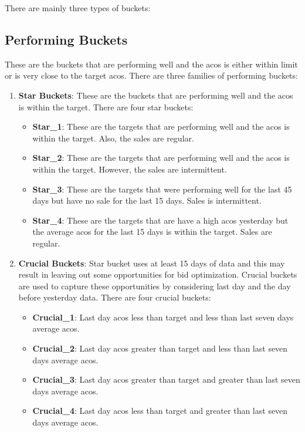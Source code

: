 There are mainly three types of buckets:

\subsection{Performing Buckets}

These are the buckets that are performing well and the acos is either within limit or is very close to the target acos. There are three families of performing buckets:

\begin{enumerate}
    \item \textbf{Star Buckets}: These are the buckets that are performing well and the acos is within the target. There are four star buckets:
          \begin{itemize}
              \item \textbf{Star\_1}: These are the targets that are performing well and the acos is within the target. Also, the sales are regular.
              \item \textbf{Star\_2}: These are the targets that are performing well and the acos is within the target. However, the sales are intermittent.
              \item \textbf{Star\_3}: These are the targets that were performing well for the last 45 days but have no sale for the last 15 days. Sales is intermittent.
              \item \textbf{Star\_4}: These are the targets that are have a high acos yesterday but the average acos for the last 15 days is within the target. Sales are regular.
          \end{itemize}
    \item \textbf{Crucial Buckets}: Star bucket uses at least 15 days of data and this may result in leaving out some opportunities for bid optimization. Crucial buckets are used to capture these opportunities by considering last day and the day before yesterday data. There are four crucial buckets:
          \begin{itemize}
              \item \textbf{Crucial\_1}: Last day acos less than target and less than last seven days average acos.
              \item \textbf{Crucial\_2}: Last day acos greater than target and less than last seven days average acos.
              \item \textbf{Crucial\_3}: Last day acos greater than target and greater than last seven days average acos.
              \item \textbf{Crucial\_4}: Last day acos less than target and greater than last seven days average acos.

\end{itemize}
\end{enumerate}
